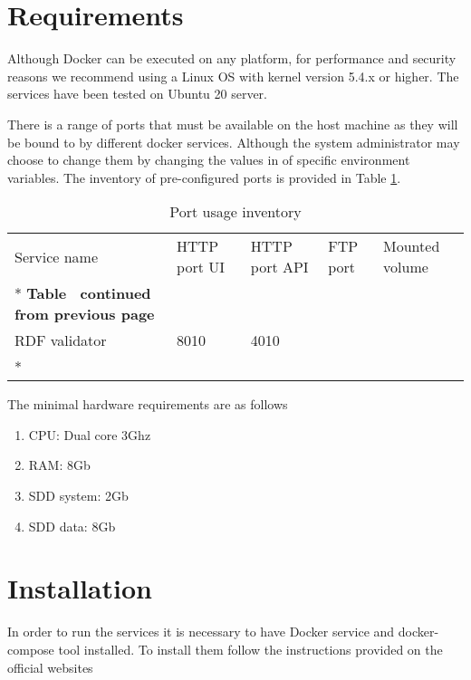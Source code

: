 \section{Requirements}
\label{sec:requirements}

Although Docker can be executed on any platform, for performance and security reasons we recommend using a Linux OS with kernel version 5.4.x or higher. The services have been tested on Ubuntu 20 server.

There is a range of ports that must be available on the host machine as they will be bound to by different docker services. Although the system administrator may choose to change them by changing the values in of specific environment variables. The inventory of pre-configured ports is provided in Table \ref{tab:port-inventory}.

\begin{longtable}[c]{@{}p{3.64cm}p{1.25cm}p{1.25cm}p{1.9cm}p{5cm}@{}}
	\toprule
	Service name  & HTTP port UI & HTTP port API & FTP port & Mounted volume \\* \midrule
	\endfirsthead
	\multicolumn{5}{c}%
	{{\bfseries Table \thetable\ continued from previous page}}              \\
	\endhead
	\bottomrule
	\endfoot
	\endlastfoot
	RDF validator & 8010         & 4010          &          &                \\* \hline
	\caption{Port usage inventory}
	\label{tab:port-inventory}                                               \\
\end{longtable}

The minimal hardware requirements are as follows
\begin{enumerate}
	\item CPU: Dual core 3Ghz
	\item RAM: 8Gb
	\item SDD system: 2Gb
	\item SDD data: 8Gb 
\end{enumerate}

\section{Installation}
\label{sec:installation}

In order to run the services it is necessary to have Docker \citep{docker} service and docker-compose tool installed. To install them follow the instructions provided on the official websites

